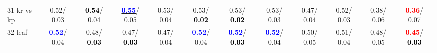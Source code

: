 \begin{table}[h]
\begin{center}
{\begin{tabular}{lc|c|c|c|c|c|c|c|c|c|c}
31-kr vs kp &   0.52/  0.03 & \textcolor{black}{\textbf{  0.54}}/  0.04 & \underline{\textcolor{blue}{\textbf{  0.55}}}/  0.05 &   0.53/  0.04 &   0.53/\textcolor{black}{\textbf{  0.02}} &   0.53/\textcolor{black}{\textbf{  0.02}} &   0.53/  0.03 &   0.47/  0.04 &   0.52/  0.03 &   0.38/  0.06 & \textcolor{red}{\textbf{  0.36}}/  0.07 \\
32-leaf & \textcolor{blue}{\textbf{  0.52}}/  0.04 &   0.48/\textcolor{black}{\textbf{  0.03}} &   0.47/\textcolor{black}{\textbf{  0.03}} &   0.47/  0.04 & \textcolor{blue}{\textbf{  0.52}}/  0.04 & \textcolor{blue}{\textbf{  0.52}}/\textcolor{black}{\textbf{  0.03}} & \textcolor{blue}{\textbf{  0.52}}/  0.04 &   0.50/  0.05 &   0.51/  0.04 &   0.48/  0.05 & \textcolor{red}{\textbf{  0.45}}/\textcolor{black}{\textbf{  0.03}} \\\end{tabular}
}\label{strats0b5NN}
\end{center}
\end{table}
